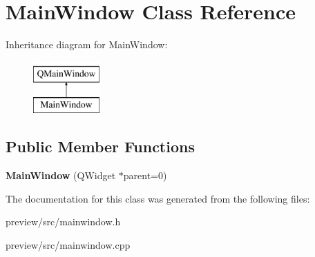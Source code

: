 \hypertarget{class_main_window}{}\section{Main\+Window Class Reference}
\label{class_main_window}
Inheritance diagram for Main\+Window\+:\begin{figure}[H]
\begin{center}
\leavevmode
\includegraphics[height=2.000000cm]{class_main_window}
\end{center}
\end{figure}
\subsection*{Public Member Functions}
\begin{DoxyCompactItemize}
\item 
\hypertarget{class_main_window_a8b244be8b7b7db1b08de2a2acb9409db}{}{\bfseries Main\+Window} (Q\+Widget $\ast$parent=0)\label{class_main_window_a8b244be8b7b7db1b08de2a2acb9409db}

\end{DoxyCompactItemize}


The documentation for this class was generated from the following files\+:\begin{DoxyCompactItemize}
\item 
preview/src/mainwindow.\+h\item 
preview/src/mainwindow.\+cpp\end{DoxyCompactItemize}
